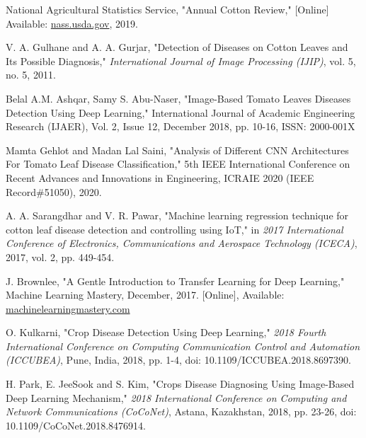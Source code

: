 \documentclass[conference]{IEEEtran}
\begin{document}
%

    
\begin{thebibliography}{00}

 National Agricultural Statistics Service, "Annual Cotton Review," [Online] Available: \href{https://www.nass.usda.gov/Statistics_by_State/Texas/Publications/Current_News_Release/2020_Rls/tx-cotton-review-2020.pdf}{nass.usda.gov}, 2019.

 V. A. Gulhane and A. A. Gurjar, "Detection of Diseases on Cotton Leaves and Its Possible Diagnosis," \textit{International Journal of Image Processing (IJIP)}, vol. 5, no. 5, 2011.

 Belal A.M. Ashqar, Samy S. Abu-Naser, "Image-Based Tomato Leaves Diseases Detection Using Deep Learning," International Journal of Academic Engineering Research (IJAER), Vol. 2, Issue 12, December 2018, pp. 10-16, ISSN: 2000-001X

 Mamta Gehlot and Madan Lal Saini, "Analysis of Different CNN Architectures For Tomato Leaf Disease Classification," 5th IEEE International Conference on Recent Advances and Innovations in Engineering, ICRAIE 2020 (IEEE Record\#51050), 2020. 

 A. A. Sarangdhar and V. R. Pawar, "Machine learning regression technique for cotton leaf disease detection and controlling using IoT," in \textit{2017 International Conference of Electronics, Communications and Aerospace Technology (ICECA)}, 2017, vol. 2, pp. 449-454.

 J. Brownlee, "A Gentle Introduction to Transfer Learning for Deep Learning," Machine Learning Mastery, December, 2017. [Online], Available: \href{https://machinelearningmastery.com/transfer-learning-for-deep-learning/#:~:text=Transfer\%20learning\%20is\%20a\%20machine,model\%20on\%20a\%20second\%20task.&text=Common\%20examples\%20of\%20transfer\%20learning,your\%20own\%20predictive\%20modeling\%20problems.}{machinelearningmastery.com}

 O. Kulkarni, "Crop Disease Detection Using Deep Learning," \textit{2018 Fourth International Conference on Computing Communication Control and Automation (ICCUBEA)}, Pune, India, 2018, pp. 1-4, doi: 10.1109/ICCUBEA.2018.8697390.

 H. Park, E. JeeSook and S. Kim, "Crops Disease Diagnosing Using Image-Based Deep Learning Mechanism," \textit{2018 International Conference on Computing and Network Communications (CoCoNet)}, Astana, Kazakhstan, 2018, pp. 23-26, doi: 10.1109/CoCoNet.2018.8476914.


\end{thebibliography}
\end{document}
